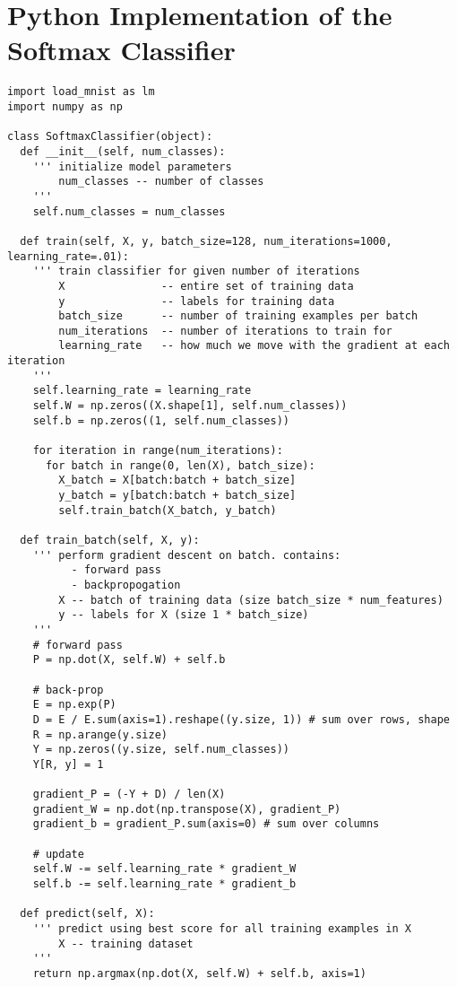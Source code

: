 \newpage
\section{Python Implementation of the Softmax Classifier}
\begin{verbatim}
import load_mnist as lm
import numpy as np

class SoftmaxClassifier(object):
  def __init__(self, num_classes):
    ''' initialize model parameters
        num_classes -- number of classes
    '''
    self.num_classes = num_classes
  
  def train(self, X, y, batch_size=128, num_iterations=1000, learning_rate=.01):
    ''' train classifier for given number of iterations
        X               -- entire set of training data
        y               -- labels for training data
        batch_size      -- number of training examples per batch
        num_iterations  -- number of iterations to train for
        learning_rate   -- how much we move with the gradient at each iteration
    '''
    self.learning_rate = learning_rate
    self.W = np.zeros((X.shape[1], self.num_classes))
    self.b = np.zeros((1, self.num_classes))
    
    for iteration in range(num_iterations):
      for batch in range(0, len(X), batch_size):
        X_batch = X[batch:batch + batch_size]
        y_batch = y[batch:batch + batch_size]
        self.train_batch(X_batch, y_batch)
  
  def train_batch(self, X, y):
    ''' perform gradient descent on batch. contains:
          - forward pass
          - backpropogation
        X -- batch of training data (size batch_size * num_features)
        y -- labels for X (size 1 * batch_size)
    '''
    # forward pass
    P = np.dot(X, self.W) + self.b

    # back-prop
    E = np.exp(P)
    D = E / E.sum(axis=1).reshape((y.size, 1)) # sum over rows, shape
    R = np.arange(y.size)
    Y = np.zeros((y.size, self.num_classes))
    Y[R, y] = 1

    gradient_P = (-Y + D) / len(X)
    gradient_W = np.dot(np.transpose(X), gradient_P)
    gradient_b = gradient_P.sum(axis=0) # sum over columns

    # update
    self.W -= self.learning_rate * gradient_W
    self.b -= self.learning_rate * gradient_b
  
  def predict(self, X):
    ''' predict using best score for all training examples in X
        X -- training dataset
    '''
    return np.argmax(np.dot(X, self.W) + self.b, axis=1)
\end{verbatim}
